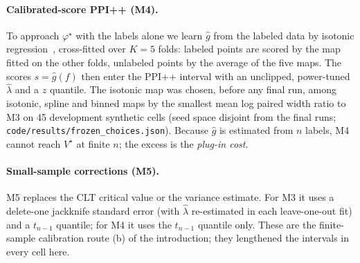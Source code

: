 \paragraph{Calibrated-score PPI++ (M4).} To approach $\varphi^\star$ with the labels alone we learn $\hat g$ from the labeled data by isotonic regression~\citep{barlow1972isotonic}, cross-fitted over $K=5$ folds: labeled points are scored by the map fitted on the other folds, unlabeled points by the average of the five maps. The scores $s=\hat g(f)$ then enter the PPI++ interval with an unclipped, power-tuned $\hat\lambda$ and a $z$ quantile. The isotonic map was chosen, before any final run, among isotonic, spline and binned maps by the smallest mean log paired width ratio to M3 on 45 development synthetic cells (seed space disjoint from the final runs; \texttt{code/results/frozen\_choices.json}). Because $\hat g$ is estimated from $n$ labels, M4 cannot reach $V^\star$ at finite $n$; the excess is the \emph{plug-in cost}.

\paragraph{Small-sample corrections (M5).} M5 replaces the CLT critical value or the variance estimate. For M3 it uses a delete-one jackknife standard error (with $\hat\lambda$ re-estimated in each leave-one-out fit) and a $t_{n-1}$ quantile; for M4 it uses the $t_{n-1}$ quantile only. These are the finite-sample calibration route (b) of the introduction; they lengthened the intervals in every cell here.
